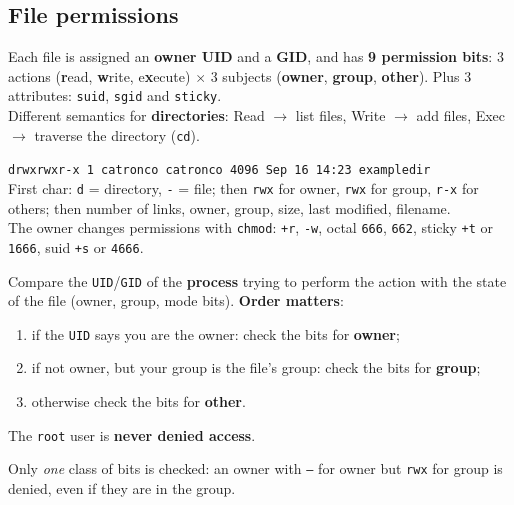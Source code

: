 \subsection{File permissions}

\begin{defnbox}[title=UNIX file ACLs]
Each file is assigned an \textbf{owner UID} and a \textbf{GID}, and has \textbf{9
permission bits}: 3 actions (\textbf{r}ead, \textbf{w}rite, e\textbf{x}ecute) $\times$ 3
subjects (\textbf{owner}, \textbf{group}, \textbf{other}). Plus 3 attributes:
\texttt{suid}, \texttt{sgid} and \texttt{sticky}. \\
Different semantics for \textbf{directories}: Read $\to$ list files, Write $\to$ add
files, Exec $\to$ traverse the directory (\texttt{cd}).
\end{defnbox}

\begin{exbox}[title=Reading \texttt{ls -l}]
\texttt{drwxrwxr-x 1 catronco catronco 4096 Sep 16 14:23 exampledir} \\
First char: \texttt{d} = directory, \texttt{-} = file; then \texttt{rwx} for owner,
\texttt{rwx} for group, \texttt{r-x} for others; then number of links, owner, group,
size, last modified, filename. \\
The owner changes permissions with \texttt{chmod}: \texttt{+r}, \texttt{-w},
octal \texttt{666}, \texttt{662}, sticky \texttt{+t} or \texttt{1666}, suid
\texttt{+s} or \texttt{4666}.
\end{exbox}

\begin{algbox}[title=UNIX access control in action]
Compare the \texttt{UID}/\texttt{GID} of the \textbf{process} trying to perform the
action with the state of the file (owner, group, mode bits). \textbf{Order matters}:
\begin{enumerate}
  \item if the \texttt{UID} says you are the owner: check the bits for \textbf{owner};
  \item if not owner, but your group is the file's group: check the bits for
        \textbf{group};
  \item otherwise check the bits for \textbf{other}.
\end{enumerate}
The \texttt{root} user is \textbf{never denied access}.
\end{algbox}

\begin{warnbox}[title=Order matters]
Only \emph{one} class of bits is checked: an owner with \texttt{---} for owner but
\texttt{rwx} for group is denied, even if they are in the group.
\end{warnbox}

